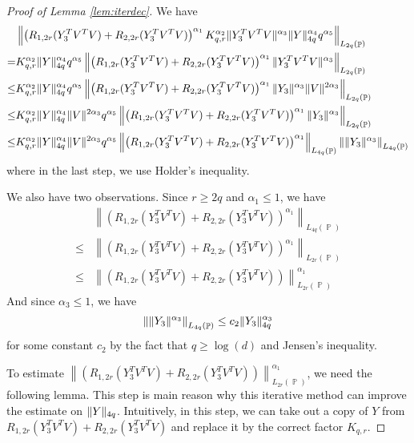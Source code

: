 \documentclass[10pt,a4paper]{amsart}
\DeclareMathOperator{\Pb}{\mathbb{P}}
\DeclarePairedDelimiter{\norm}{\lVert}{\rVert}
\newcommand{\norml}[1]{\left\lVert#1\right\rVert}
\begin{document}
\begin{proof}[Proof of Lemma \ref{lem:iterdec}]
We have
\begin{align*}
    &\norml{\left(R_{1,2r}(Y_3^TV^TV)+R_{2,2r}(Y_3^TV^TV)\right)^{\alpha_1}K_{q,r}^{\alpha_2}\norm{Y_3^TV^TV}^{\alpha_3} \norm{Y}_{4q} ^{\alpha_4}q^{\alpha_5}}_{L_{2q}(\Pb)}
    \\=&K_{q,r}^{\alpha_2}\norm{Y}_{4q}^{\alpha_4}q^{\alpha_5}\norml{\left(R_{1,2r}(Y_3^TV^TV)+R_{2,2r}(Y_3^TV^TV)\right)^{\alpha_1}\norm{Y_3^TV^TV}^{\alpha_3}  }_{L_{2q}(\Pb)}
    \\ \le &K_{q,r}^{\alpha_2}\norm{Y}_{4q}^{\alpha_4}q^{\alpha_5}\norml{\left(R_{1,2r}(Y_3^TV^TV)+R_{2,2r}(Y_3^TV^TV)\right)^{\alpha_1}\norm{Y_3}^{\alpha_3} \norm{V}^{2 \alpha_3}  }_{L_{2q}(\Pb)}
    \\ \le &K_{q,r}^{\alpha_2}\norm{Y}_{4q}^{\alpha_4}\norm{V}^{2 \alpha_3}q^{\alpha_5}\norml{\left(R_{1,2r}(Y_3^TV^TV)+R_{2,2r}(Y_3^TV^TV)\right)^{\alpha_1}\norm{Y_3}^{\alpha_3}   }_{L_{2q}(\Pb)}
    \\ \le &K_{q,r}^{\alpha_2}\norm{Y}_{4q}^{\alpha_4}\norm{V}^{2 \alpha_3}q^{\alpha_5}\norml{\left(R_{1,2r}(Y_3^TV^TV)+R_{2,2r}(Y_3^TV^TV)\right)^{\alpha_1}}_{L_{4q}(\Pb)}\norml{\norm{Y_3}^{\alpha_3}   }_{L_{4q}(\Pb)}
\end{align*}
where in the last step, we use Holder's inequality.

We also have two observations. Since $r \ge 2q$ and $\alpha_1 \le 1$, we have
\begin{align*}
    &\norml{\left(R_{1,2r}(Y_3^TV^TV)+R_{2,2r}(Y_3^TV^TV)\right)^{\alpha_1}}_{L_{4q}(\Pb)}
    \\ \le & \norml{\left(R_{1,2r}(Y_3^TV^TV)+R_{2,2r}(Y_3^TV^TV)\right)^{\alpha_1}}_{L_{2r}(\Pb)}
    \\ \le & \norml{\left(R_{1,2r}(Y_3^TV^TV)+R_{2,2r}(Y_3^TV^TV)\right)}_{L_{2r}(\Pb)}^{\alpha_1}
\end{align*}
And since $\alpha_3 \le 1$, we have
\begin{align*}
    \norml{\norm{Y_3}^{\alpha_3}   }_{L_{4q}(\Pb)} \le c_2\norm{Y_3}_{4q}^{\alpha_3}
\end{align*}
for some constant $c_2$ by the fact that $q \ge \log(d)$ and Jensen's inequality.

To estimate $\norml{\left(R_{1,2r}(Y_3^TV^TV)+R_{2,2r}(Y_3^TV^TV)\right)}_{L_{2r}(\Pb)}^{\alpha_1}$, we need the following lemma. This step is main reason why this iterative method can improve the estimate on $\norm{Y}_{4q}$. Intuitively, in this step, we can take out a copy of $Y$ from $R_{1,2r}(Y_3^TV^TV)+R_{2,2r}(Y_3^TV^TV)$ and replace it by the correct factor $K_{q,r}$.


\end{proof}
\end{document}
